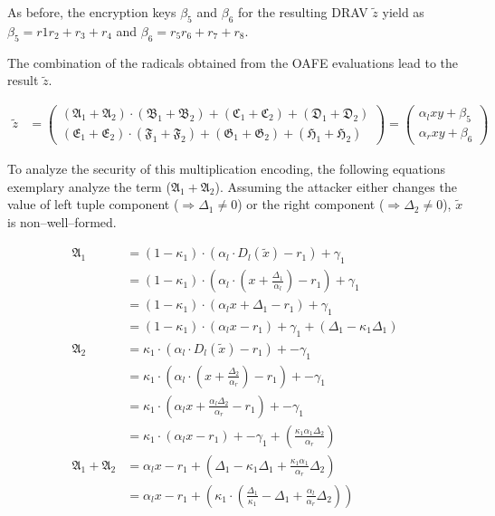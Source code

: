 \noindent{}As before, the encryption keys $\beta_5$ and $\beta_6$ for the
resulting DRAV $\widetilde{z}$ yield as $\beta_5 = r1r_2 + r_3 + r_4$ and
$\beta_6 = r_5r_6 + r_7 + r_8$.

The combination of the radicals obtained from the OAFE evaluations lead to the
result $\widetilde{z}$.

\begin{align*}
  \widetilde{z} & =
  \begin{pmatrix}%
    (\mathfrak{A}_1+\mathfrak{A}_2) \cdot
    (\mathfrak{B}_1+\mathfrak{B}_2) +
    (\mathfrak{C}_1+\mathfrak{C}_2) +
    (\mathfrak{D}_1+\mathfrak{D}_2)\\
    (\mathfrak{E}_1+\mathfrak{E}_2) \cdot
    (\mathfrak{F}_1+\mathfrak{F}_2) +
    (\mathfrak{G}_1+\mathfrak{G}_2) +
    (\mathfrak{H}_1+\mathfrak{H}_2)
  \end{pmatrix}
   =
   \begin{pmatrix}
     \alpha_l xy + \beta_5 \\
     \alpha_r xy + \beta_6
   \end{pmatrix}
\end{align*}

\noindent{}To analyze the security of this multiplication encoding, the
following equations exemplary analyze the term ($\mathfrak{A}_1 +
\mathfrak{A}_2$). Assuming the attacker either changes the value of left tuple
component ($\Rightarrow \Delta_1 \neq 0$) or the right component ($\Rightarrow
\Delta_2 \neq 0$), $\widetilde{x}$ is non--well--formed.

\begin{align*}
%
  \mathfrak{A}_1 &=
  (1 - \kappa_1) \cdot
  (\alpha_l \cdot D_l(\widetilde{x}) - r_1) +
  \gamma_1 \\
  & =
  (1 - \kappa_1) \cdot
  \left(\alpha_l \cdot \left(x + \frac{\Delta_1}{\alpha_l}\right) - r_1\right) +
  \gamma_1 \\
  & =
  (1 - \kappa_1) \cdot
  \left(\alpha_l x + \Delta_1 - r_1\right) +
  \gamma_1 \\
  & =
  (1 - \kappa_1) \cdot
  \left(\alpha_l x - r_1\right) +
  \gamma_1 +
  (\Delta_1 - \kappa_1\Delta_1)\\
  \mathfrak{A}_2 &=
  \kappa_1 \cdot
  (\alpha_l \cdot D_l(\widetilde{x}) - r_1) +
  -\gamma_1 \\
  & =
  \kappa_1 \cdot
  \left(\alpha_l \cdot \left(x + \frac{\Delta_2}{\alpha_r}\right) - r_1\right) +
  -\gamma_1 \\
  & =
  \kappa_1 \cdot
  \left(\alpha_l x + \frac{\alpha_l\Delta_2}{\alpha_r} - r_1\right) +
  -\gamma_1 \\
  & =
  \kappa_1 \cdot
  \left(\alpha_l x - r_1\right) +
  -\gamma_1 +
  \left(\frac{\kappa_1\alpha_1\Delta_2}{\alpha_r}\right)\\
\mathfrak{A}_1 + \mathfrak{A}_2 &=
  \alpha_l x - r_1 +
  \left(
    \Delta_1 - \kappa_1\Delta_1 +
    \frac{\kappa_1\alpha_1}{\alpha_r}\Delta_2
  \right)\\
  &=
  \alpha_l x - r_1 +
  \left(
    \kappa_1 \cdot \left(\frac{\Delta_1}{\kappa_1} - \Delta_1 +
    \frac{\alpha_l}{\alpha_r}\Delta_2\right)
  \right)\\
%
\end{align*}

